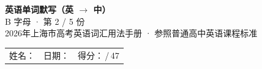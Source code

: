 \documentclass[10pt,a4paper]{article}
\begin{document}
\pagestyle{plain}

\begin{center}
{\LARGE\bfseries 英语单词默写（英 $\to$ 中）}\\[0.22em]
{\large B 字母 · 第 2 / 5 份}\\[0.18em]
{\small 2026年上海市高考英语词汇用法手册 · 参照普通高中英语课程标准}
\end{center}

\vspace{0.25em}
\noindent\begin{tabular}{@{}p{}@{}p{}@{}p{}@{}}
姓名：\underline{\hspace{2.0cm}} & 日期：\underline{\hspace{2.0cm}} & 得分：\underline{\hspace{1.3cm}}\,/\,47 \\
\end{tabular}

\vspace{0.3em}

\vspace{0.08em}
\end{document}
